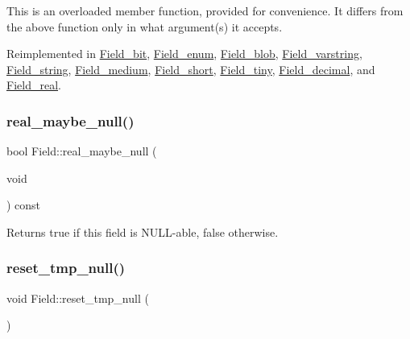 This is an overloaded member function, provided for convenience. It differs from the above function only in what argument(s) it accepts.

Reimplemented in \mbox{\hyperlink{classField__bit_a330cb15674837be6c0487ffcbbdc9ba4}{Field\+\_\+bit}}, \mbox{\hyperlink{classField__enum_ab9e1135fdf17255f7a96193463d58bdd}{Field\+\_\+enum}}, \mbox{\hyperlink{classField__blob_ae15681deef846bd350bdb09b5132b120}{Field\+\_\+blob}}, \mbox{\hyperlink{classField__varstring_a4e54b98a33cc68aa2c137a88a317f040}{Field\+\_\+varstring}}, \mbox{\hyperlink{classField__string_a2394757ed93148a4ad7199e93ace382b}{Field\+\_\+string}}, \mbox{\hyperlink{classField__medium_a1c93838ae85a69a18a5d3e88da916369}{Field\+\_\+medium}}, \mbox{\hyperlink{classField__short_a53af61e2ddf7e5e25d67e1bd1ea78099}{Field\+\_\+short}}, \mbox{\hyperlink{classField__tiny_ac3326a980428d393cd52d821578f87d7}{Field\+\_\+tiny}}, \mbox{\hyperlink{classField__decimal_a85c1f4498b4f8f773056efcf6c3a901a}{Field\+\_\+decimal}}, and \mbox{\hyperlink{classField__real_a350715a27630782dd1247287d2446480}{Field\+\_\+real}}.

\mbox{\label{classField_a9b78f4fab3123edfb5117f7937a116ed}} 
\subsubsection{\texorpdfstring{real\+\_\+maybe\+\_\+null()}{real\_maybe\_null()}}
{\footnotesize\ttfamily bool Field\+::real\+\_\+maybe\+\_\+null (\begin{DoxyParamCaption}\item[{void}]{ }\end{DoxyParamCaption}) const\hspace{0.3cm}{\ttfamily [inline]}}

\begin{DoxyReturn}{Returns}
true if this field is N\+U\+LL-\/able, false otherwise. 
\end{DoxyReturn}
\mbox{\label{classField_a55c0d34f3da0b578e1f94144b37f3853}} 
\subsubsection{\texorpdfstring{reset\+\_\+tmp\+\_\+null()}{reset\_tmp\_null()}}
{\footnotesize\ttfamily void Field\+::reset\+\_\+tmp\+\_\+null (\begin{DoxyParamCaption}{ }\end{DoxyParamCaption})\hspace{0.3cm}{\ttfamily [inline]}}

